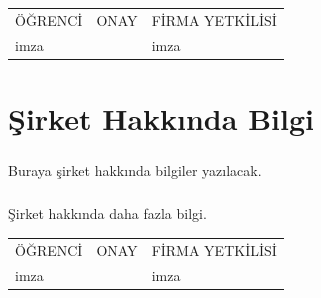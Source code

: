 \documentclass[12pt,a4paper]{report}
\begin{document}
  


\tableofcontents

\mbox{}
\vfill
\begin{center}
\begin{tabular}{|>{\centering}m{3.6cm}|>{\centering}m{7.4cm}|>{\centering}m{4cm}|}
ÖĞRENCİ&ONAY&FİRMA YETKİLİSİ
\tabularnewline
imza &&imza
\end{tabular}
\end{center}
\newpage
\chapter*{Şirket Hakkında Bilgi}

\paragraph{} Buraya şirket hakkında bilgiler yazılacak.
\paragraph{} Şirket hakkında daha fazla bilgi.
\mbox{}
\vfill
\begin{center}
\begin{tabular}{|>{\centering}m{3.6cm}|>{\centering}m{7.4cm}|>{\centering}m{4cm}|}
ÖĞRENCİ&ONAY&FİRMA YETKİLİSİ
\tabularnewline
imza &&imza
\end{tabular}
\end{center}


\newpage %
 
\end{document}
